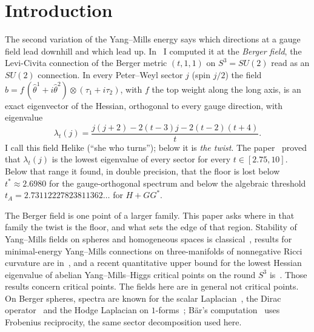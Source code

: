 \documentclass[11pt]{article}
\theoremstyle{definition}
\theoremstyle{remark}
\begin{document}
\section{Introduction}\label{sec:intro}

The second variation of the Yang--Mills energy says which directions at a gauge field lead downhill and which lead
up. In~\cite{davisfloor2026} I computed it at the \emph{Berger field}, the Levi-Civita connection of the Berger
metric $(t,1,1)$ on $S^3=SU(2)$ read as an $SU(2)$ connection. In every Peter--Weyl sector $j$ (spin $j/2$) the
field $b=f\,(\hat\theta^1+i\hat\theta^2)\otimes(\tau_1+i\tau_2)$, with $f$ the top weight along the long axis, is an
exact eigenvector of the Hessian, orthogonal to every gauge direction, with eigenvalue
\[
  \lambda_t(j)=\frac{j(j+2)-2(t-3)j-2(t-2)(t+4)}{t}.
\]
I call this field Helike (``she who turns''); below it is \emph{the twist}. The paper~\cite{davisfloor2026} proved
that $\lambda_t(j)$ is the lowest eigenvalue of every sector for every $t\in[2.75,10]$. Below that range it found, in
double precision, that the floor is lost below $t^*\approx2.6980$ for the gauge-orthogonal spectrum and below the
algebraic threshold $t_A=2.73112227823811362\ldots$ for $H+GG^*$.

The Berger field is one point of a larger family. This paper asks where in that family the twist is the floor, and
what sets the edge of that region. Stability of Yang--Mills fields on spheres and homogeneous spaces is
classical~\cite{bl1981,laquer1984,ohnitapan1990,kot1986}, results for minimal-energy Yang--Mills connections on
three-manifolds of nonnegative Ricci curvature are in~\cite{stern2010}, and a recent quantitative upper bound for the
lowest Hessian eigenvalue of abelian Yang--Mills--Higgs critical points on the round $S^3$ is~\cite{jin2026}. Those
results concern critical points. The fields here are in general not critical points. On Berger spheres, spectra are
known for the scalar Laplacian~\cite{lauret2019}, the Dirac operator~\cite{bar1992,klingschueth2022} and the Hodge
Laplacian on $1$-forms~\cite{henkellauret2026}; B\"ar's computation~\cite{bar1992} uses Frobenius reciprocity, the
same sector decomposition used here.
\end{document}

